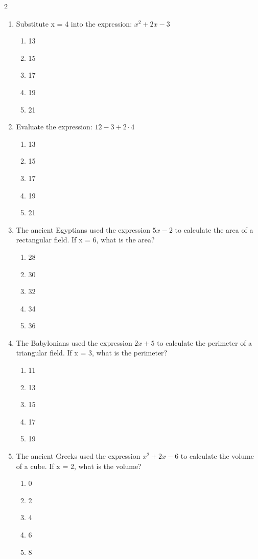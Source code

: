 \documentclass[10pt]{article}
\begin{document}
\begin{multicols}{2}
\begin{enumerate}[label=\textbf{Q\arabic*.}, leftmargin=*, itemsep=6pt, parsep=0pt]
  \item \small Substitute x = 4 into the expression: $x^2 + 2x - 3$
  \begin{enumerate}[label=(\Alph*), leftmargin=0.6cm, nosep, itemsep=2pt]
    \item 13
    \item 15
    \item 17
    \item 19
    \item 21
  \end{enumerate}

  \item \small Evaluate the expression: $12 - 3 + 2 \cdot 4$
  \begin{enumerate}[label=(\Alph*), leftmargin=0.6cm, nosep, itemsep=2pt]
    \item 13
    \item 15
    \item 17
    \item 19
    \item 21
  \end{enumerate}

  \item \small The ancient Egyptians used the expression $5x - 2$ to calculate the area of a rectangular field. If x = 6, what is the area?
  \begin{enumerate}[label=(\Alph*), leftmargin=0.6cm, nosep, itemsep=2pt]
    \item 28
    \item 30
    \item 32
    \item 34
    \item 36
  \end{enumerate}

  \item \small The Babylonians used the expression $2x + 5$ to calculate the perimeter of a triangular field. If x = 3, what is the perimeter?
  \begin{enumerate}[label=(\Alph*), leftmargin=0.6cm, nosep, itemsep=2pt]
    \item 11
    \item 13
    \item 15
    \item 17
    \item 19
  \end{enumerate}

  \item \small The ancient Greeks used the expression $x^2 + 2x - 6$ to calculate the volume of a cube. If x = 2, what is the volume?
  \begin{enumerate}[label=(\Alph*), leftmargin=0.6cm, nosep, itemsep=2pt]
    \item 0
    \item 2
    \item 4
    \item 6
    \item 8
  \end{enumerate}

\end{enumerate}
\end{multicols}
\end{document}
